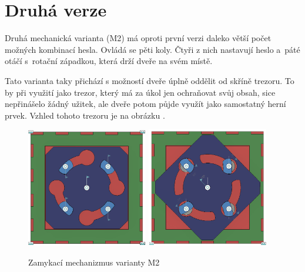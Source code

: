 \section{Druhá verze}
\label{M2-vyvoj}

Druhá mechanická varianta (M2) má oproti první verzi daleko větší počet možných kombinací hesla.
Ovládá se pěti koly. Čtyři z nich nastavují heslo a~páté otáčí s~rotační západkou, která drží dveře na svém místě.

Tato varianta taky přichází s možností dveře úplně oddělit od skříně trezoru. To by při využití jako trezor, který
má za úkol jen ochraňovat svůj obsah, sice nepřinášelo žádný užitek, ale dveře potom půjde využít jako samostatný herní prvek.
Vzhled tohoto trezoru je na obrázku .

\begin{figure}[htbp]
    \centering
    \includegraphics[width=150pt]{kapitoly/obrazky/M2/mechanizmus_odemcen.png}
    \includegraphics[width=150pt]{kapitoly/obrazky/M2/mechanizmus_zamceno.png}
    \caption{Zamykací mechanizmus varianty M2}
    \label{fig:M2-mechanizmus}
\end{figure}

\newpage